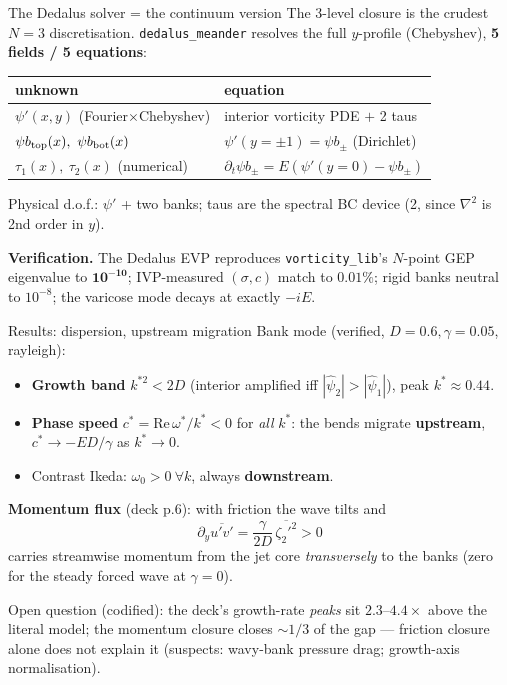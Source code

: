 \documentclass[aspectratio=169,10pt]{beamer}
\newcommand{\hl}[2]{\textcolor{#1}{\textbf{#2}}}
\newcommand{\pp}{\psi'}
\newcommand{\dt}{\partial_t}
\begin{document}
\begin{frame}{The Dedalus solver = the continuum version}
The 3-level closure is the crudest $N=3$ discretisation. \texttt{dedalus\_meander}
resolves the full $y$-profile (Chebyshev), \hl{cChannel}{5 fields / 5 equations}:
\begin{center}\footnotesize
\begin{tabular}{@{}ll@{}}
\toprule
unknown & equation\\
\midrule
$\pp(x,y)$ (Fourier$\times$Chebyshev) & interior vorticity PDE $+$ 2 taus\\
$\psi b_{\rm top}(x),\ \psi b_{\rm bot}(x)$ & $\pp(y{=}\pm1)=\psi b_{\pm}$ (Dirichlet)\\
$\tau_1(x),\ \tau_2(x)$ (numerical) & $\dt\psi b_{\pm}=E(\pp(y{=}0)-\psi b_{\pm})$\\
\bottomrule
\end{tabular}
\end{center}
Physical d.o.f.: $\pp$ + two banks; taus are the spectral BC device (2, since
$\nabla^2$ is 2nd order in $y$).
\smallskip

\hl{cGrowth}{Verification.} The Dedalus EVP reproduces \texttt{vorticity\_lib}'s
$N$-point GEP eigenvalue to $\mathbf{10^{-10}}$; IVP-measured $(\sigma,c)$ match to
$0.01\%$; rigid banks neutral to $10^{-8}$; the varicose mode decays at exactly $-iE$.
\end{frame}

\begin{frame}{Results: dispersion, upstream migration}
Bank mode (verified, $D=0.6,\gamma=0.05$, rayleigh):
\begin{itemize}\footnotesize
  \item \hl{cChannel}{Growth band} $k^{*2}<2D$ (interior amplified iff $|\hat\psi_2|>|\hat\psi_1|$), peak $k^*\!\approx\!0.44$.
  \item \hl{cCurv}{Phase speed} $c^*=\mathrm{Re}\,\omega^*/k^*<0$ for \emph{all} $k^*$:
        the bends migrate \hl{cCurv}{upstream}, $c^*\to-ED/\gamma$ as $k^*\to0$.
  \item Contrast Ikeda: $\omega_0>0\ \forall k$, always \hl{cVeloc}{downstream}.
\end{itemize}
\smallskip
\hl{cEros}{Momentum flux} (deck p.6): with friction the wave tilts and
\[
\partial_y\overline{u'v'}=\frac{\gamma}{2D}\,\overline{\zeta_2'^2}>0
\]
carries streamwise momentum from the jet core \emph{transversely} to the banks
(zero for the steady forced wave at $\gamma=0$).
\smallskip

\footnotesize Open question (codified): the deck's growth-rate \emph{peaks} sit $2.3$--$4.4\times$
above the literal model; the momentum closure closes $\sim1/3$ of the gap --- friction
closure alone does not explain it (suspects: wavy-bank pressure drag; growth-axis normalisation).
\end{frame}
\end{document}
